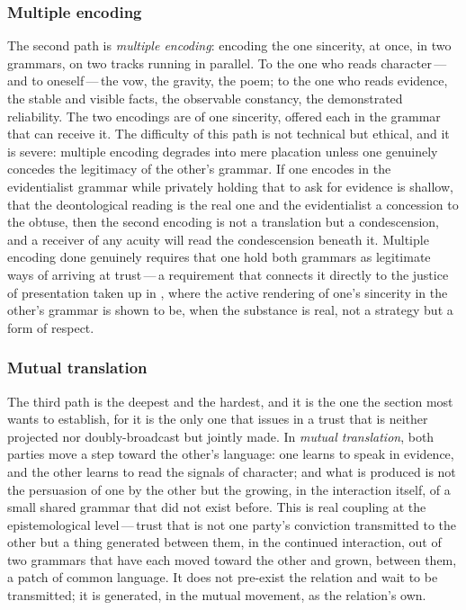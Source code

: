 \subsubsection{Multiple encoding}
\label{p13:sub:trans-multiple}

The second path is \emph{multiple encoding}: encoding the one sincerity, at once, in two grammars, on two tracks running in parallel. To the one who reads character\,---\,and to oneself\,---\,the vow, the gravity, the poem; to the one who reads evidence, the stable and visible facts, the observable constancy, the demonstrated reliability. The two encodings are of one sincerity, offered each in the grammar that can receive it. The difficulty of this path is not technical but ethical, and it is severe: multiple encoding degrades into mere placation unless one genuinely concedes the legitimacy of the other's grammar. If one encodes in the evidentialist grammar while privately holding that to ask for evidence is shallow, that the deontological reading is the real one and the evidentialist a concession to the obtuse, then the second encoding is not a translation but a condescension, and a receiver of any acuity will read the condescension beneath it. Multiple encoding done genuinely requires that one hold both grammars as legitimate ways of arriving at trust\,---\,a requirement that connects it directly to the justice of presentation taken up in , where the active rendering of one's sincerity in the other's grammar is shown to be, when the substance is real, not a strategy but a form of respect.

\subsubsection{Mutual translation}
\label{p13:sub:trans-mutual}

The third path is the deepest and the hardest, and it is the one the section most wants to establish, for it is the only one that issues in a trust that is neither projected nor doubly-broadcast but jointly made. In \emph{mutual translation}, both parties move a step toward the other's language: one learns to speak in evidence, and the other learns to read the signals of character; and what is produced is not the persuasion of one by the other but the growing, in the interaction itself, of a small shared grammar that did not exist before. This is real coupling at the epistemological level\,---\,trust that is not one party's conviction transmitted to the other but a thing generated between them, in the continued interaction, out of two grammars that have each moved toward the other and grown, between them, a patch of common language. It does not pre-exist the relation and wait to be transmitted; it is generated, in the mutual movement, as the relation's own.

